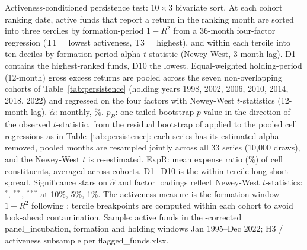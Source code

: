 \begin{table}[!htbp]
\begin{minipage}{\tabletempwidth}
\begin{singlespace}
Activeness-conditioned persistence test: $10 \times 3$ bivariate sort. At each cohort ranking date, active funds that report a return in the ranking month are sorted into three terciles by formation-period $1 - R^2$ from a 36-month \textcite{Carhart1997} four-factor regression (T1 = lowest activeness, T3 = highest), and within each tercile into ten deciles by formation-period alpha $t$-statistic (Newey-West, 3-month lag). D1 contains the highest-ranked funds, D10 the lowest. Equal-weighted holding-period (12-month) gross excess returns are pooled across the seven non-overlapping cohorts of Table~\ref{tab:persistence} (holding years 1998, 2002, 2006, 2010, 2014, 2018, 2022) and regressed on the \textcite{Carhart1997} four factors with Newey-West $t$-statistics (12-month lag). $\hat{\alpha}$: monthly, \%. $p_B$: one-tailed bootstrap $p$-value in the direction of the observed $t$-statistic, from the residual bootstrap of \textcite{FamaFrench2010} applied to the pooled cell regressions as in Table~\ref{tab:persistence}: each series has its estimated alpha removed, pooled months are resampled jointly across all 33 series (10,000 draws), and the Newey-West $t$ is re-estimated. ExpR: mean expense ratio (\%) of cell constituents, averaged across cohorts. D1$-$D10 is the within-tercile long-short spread. Significance stars on $\hat{\alpha}$ and factor loadings reflect Newey-West $t$-statistics: $^{*}$, $^{**}$, $^{***}$ at 10\%, 5\%, 1\%. The activeness measure is the formation-window $1 - R^2$ following \textcite{AmihudGoyenko2013}; tercile breakpoints are computed within each cohort to avoid look-ahead contamination. Sample: active funds in the \textcite{Evans2010}-corrected panel\_incubation, formation and holding windows Jan 1995--Dec 2022; H3 / activeness subsample per flagged\_funds.xlsx.
\end{singlespace}
\end{minipage}
\end{table}

